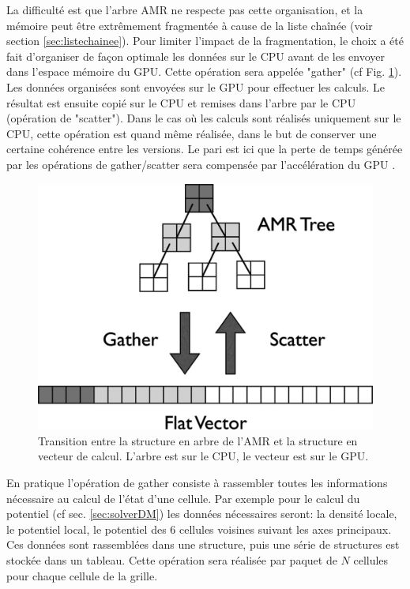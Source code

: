 La difficulté est que l'arbre \ac{AMR} ne respecte pas cette organisation, et la mémoire peut être extrêmement fragmentée à cause de la liste chaînée (voir section \ref{sec:listechainee}).
Pour limiter l'impact de la fragmentation, le choix a été fait d'organiser de façon optimale les données sur le \ac{CPU} avant de les envoyer dans l'espace mémoire du \ac{GPU}.
Cette opération sera appelée "gather" (cf Fig. \ref{fig:gatherscatter}).
Les données organisées sont envoyées sur le \ac{GPU} pour effectuer les calculs.
Le résultat est ensuite copié sur le \ac{CPU} et remises dans l'arbre par le \ac{CPU} (opération de "scatter").
Dans le cas où les calculs sont réalisés uniquement sur le \ac{CPU}, cette opération est quand même réalisée, dans le but de conserver une certaine cohérence entre les versions.
Le pari est ici que la perte de temps générée par les opérations de gather/scatter sera compensée par l'accélération du \ac{GPU} .

\begin{figure}
        \includegraphics[width=.95\linewidth]{img/02/gatherscatter.jpg} 
        \caption[Passage AMR / vecteur]{Transition entre la structure en arbre de l'AMR et la structure en vecteur de calcul.
        L'arbre est sur le CPU, le vecteur est sur le GPU.
 		\label{fig:gatherscatter}
 		}
\end{figure}


En pratique l'opération de gather consiste à rassembler toutes les informations nécessaire au calcul de l'état d'une cellule.
Par exemple pour le calcul du potentiel (cf sec. \ref{sec:solverDM}) les données nécessaires seront: la densité locale, le potentiel local, le potentiel des 6 cellules voisines suivant les axes principaux.
Ces données sont rassemblées dans une structure, puis une série de structures est stockée dans un tableau.
Cette opération sera réalisée par paquet de $N$ cellules pour chaque cellule de la grille.

